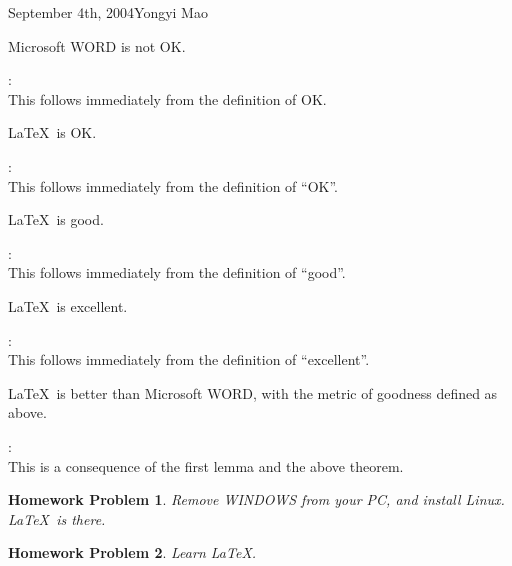 \documentclass{article}
\newtheorem{hw}{Homework Problem}
\begin{document}
\begin{lecture}{September 4th, 2004}{Yongyi Mao}
\begin{lemma}
Microsoft WORD is not OK.
\end{lemma}

\Proof :\\
This follows immediately from the definition of OK.
\QED

\begin{lemma}
\LaTeX\ is OK.
\end{lemma}

\Proof :\\
This follows immediately from the definition of ``OK''.
\QED

\begin{proposition}
\LaTeX\ is good.
\end{proposition}

\Proof :\\
This follows immediately from the definition of ``good''.
\QED

\begin{theorem} \LaTeX\ is excellent.
\end{theorem}

\Proof :\\
This follows immediately from the definition of ``excellent''.
\QED

\begin{corollary}
\LaTeX\  is better than Microsoft WORD, with the metric of goodness
defined as above.
\end{corollary}

\Proof :\\
This is a consequence of the first lemma and the above theorem. \QED

\begin{hw}
Remove WINDOWS from your PC, and install Linux. 
\LaTeX\ is there.
\end{hw}

\begin{hw}
Learn \LaTeX.
\end{hw}



\end{lecture}
\end{document}
